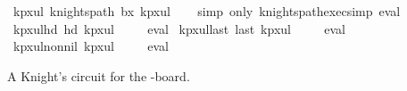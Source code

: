 \begin{isabellebody}
\isamarkupfalse%
\ kp{\isacharunderscore}{\kern0pt}{}x{}{\isacharunderscore}{\kern0pt}ul{\isacharcolon}{\kern0pt}\ {\isachardoublequoteopen}knights{\isacharunderscore}{\kern0pt}path\ b{}x{}\ kp{}x{}ul{\isachardoublequoteclose}\isanewline
%
\isadelimproof
\ \ %
\endisadelimproof
%
\isatagproof
{}\isamarkupfalse%
\ {\isacharparenleft}{\kern0pt}simp\ only{\isacharcolon}{\kern0pt}\ knights{\isacharunderscore}{\kern0pt}path{\isacharunderscore}{\kern0pt}exec{\isacharunderscore}{\kern0pt}simp{\isacharparenright}{\kern0pt}\ eval%
\endisatagproof
{\isafoldproof}%
%
\isadelimproof
\isanewline
%
\endisadelimproof
\isanewline
{}\isamarkupfalse%
\ kp{\isacharunderscore}{\kern0pt}{}x{}{\isacharunderscore}{\kern0pt}ul{\isacharunderscore}{\kern0pt}hd{\isacharcolon}{\kern0pt}\ {\isachardoublequoteopen}hd\ kp{}x{}ul\ {\isacharequal}{\kern0pt}\ {\isacharparenleft}{\kern0pt}{}{\isacharcomma}{\kern0pt}{}{\isacharparenright}{\kern0pt}{\isachardoublequoteclose}%
\isadelimproof
\ %
\endisadelimproof
%
\isatagproof
{}\isamarkupfalse%
\ eval%
\endisatagproof
{\isafoldproof}%
%
\isadelimproof
%
\endisadelimproof
\isanewline
\isanewline
{}\isamarkupfalse%
\ kp{\isacharunderscore}{\kern0pt}{}x{}{\isacharunderscore}{\kern0pt}ul{\isacharunderscore}{\kern0pt}last{\isacharcolon}{\kern0pt}\ {\isachardoublequoteopen}last\ kp{}x{}ul\ {\isacharequal}{\kern0pt}\ {\isacharparenleft}{\kern0pt}{}{\isacharcomma}{\kern0pt}{}{\isacharparenright}{\kern0pt}{\isachardoublequoteclose}%
\isadelimproof
\ %
\endisadelimproof
%
\isatagproof
{}\isamarkupfalse%
\ eval%
\endisatagproof
{\isafoldproof}%
%
\isadelimproof
%
\endisadelimproof
\isanewline
\isanewline
{}\isamarkupfalse%
\ kp{\isacharunderscore}{\kern0pt}{}x{}{\isacharunderscore}{\kern0pt}ul{\isacharunderscore}{\kern0pt}non{\isacharunderscore}{\kern0pt}nil{\isacharcolon}{\kern0pt}\ {\isachardoublequoteopen}kp{}x{}ul\ {\isasymnoteq}\ {\isacharbrackleft}{\kern0pt}{\isacharbrackright}{\kern0pt}{\isachardoublequoteclose}%
\isadelimproof
\ %
\endisadelimproof
%
\isatagproof
{}\isamarkupfalse%
\ eval%
\endisatagproof
{\isafoldproof}%
%
\isadelimproof
%
\endisadelimproof
%
\begin{isamarkuptext}%
A Knight's circuit for the -board.

\end{isamarkuptext}
\end{isabellebody}
